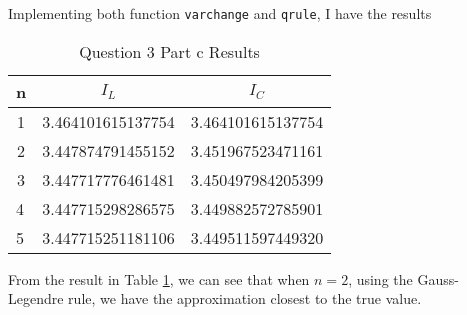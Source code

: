 \begin{answer}
    Implementing both function \verb+varchange+ and \verb+qrule+, I have the results
    \begin{table}[H]
    \centering
    \caption{Question 3 Part c Results}
    \label{tab:tab3}
    \begin{tabular}{|c|c|c|}
    \hline
    \textbf{n}              & \textbf{$I_L$}                            & \textbf{$I_C$}                            \\ \hline
    1                       & 3.464101615137754                      & 3.464101615137754                      \\ \hline
    2                       & 3.447874791455152                      & 3.451967523471161                      \\ \hline
    3                       & 3.447717776461481                      & 3.450497984205399                      \\ \hline
    \multicolumn{1}{|l|}{4} & \multicolumn{1}{l|}{3.447715298286575} & \multicolumn{1}{l|}{3.449882572785901} \\ \hline
    \multicolumn{1}{|l|}{5} & \multicolumn{1}{l|}{3.447715251181106} & \multicolumn{1}{l|}{3.449511597449320} \\ \hline
    \end{tabular}
    \end{table}
    From the result in Table \ref{tab:tab3}, we can see that when $n = 2$, using the Gauss-Legendre rule, we have the approximation closest to the true value.
\end{answer}